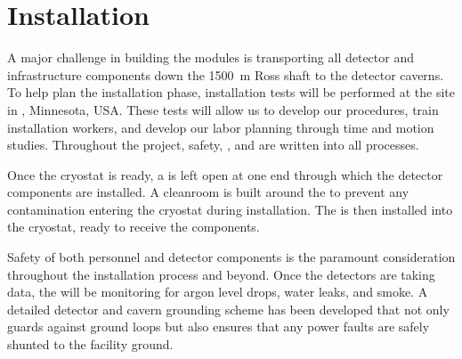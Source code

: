 \section{Installation}

A major challenge in building the   modules is transporting all detector and infrastructure components down the \SI{1500}{\meter} Ross shaft to the detector caverns. To help plan the installation phase, installation tests will be performed at the   site in , Minnesota, USA. These tests will allow us to develop our procedures, train installation workers, and develop our labor planning through time and motion studies. Throughout the project, safety, , and  are written into all processes.

Once the  cryostat is ready, %
a  is left open at one end through which the detector components are installed. A cleanroom is built around the  to prevent any contamination entering the cryostat during installation. The  is then installed into the cryostat, ready to receive the  components. 


Safety of both personnel and  detector components is the paramount consideration throughout the installation process and beyond. Once the detectors are taking data, %
the  will be monitoring for argon level drops, water leaks, and smoke. A detailed detector and cavern grounding scheme has been developed that not only guards against ground loops but also ensures that any power faults are safely shunted to the facility ground.

